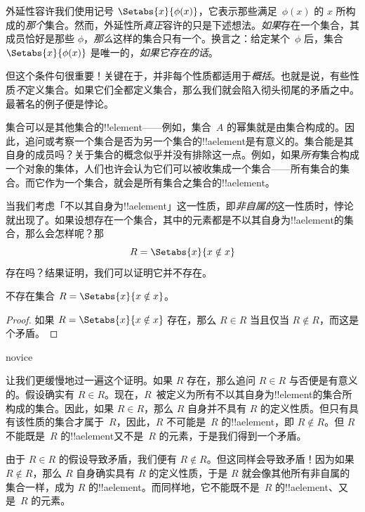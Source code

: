 \documentclass[../../../include/open-logic-section]{subfiles}
\begin{document}

外延性容许我们使用记号 $\Setabs{x}{\phi(x)}$，它表示那些满足~$\phi(x)$ 的 $x$ 所构成的\emph{那个}集合。然而，外延性所\emph{真正}容许的只是下述想法。\emph{如果}存在一个集合，其成员恰好是那些 $\phi$，\emph{那么}这样的集合只有一个。换言之：给定某个~$\phi$ 后，集合 $\Setabs{x}{\phi(x)}$ 是唯一的，\emph{如果它存在的话}。

但这个条件句很重要！{}关键在于，并非每个性质都适用于\emph{概括}。也就是说，有些性质\emph{不}定义集合。如果它们全都定义集合，那么我们就会陷入彻头彻尾的矛盾之中。最著名的例子便是悖论。

集合可以是其他集合的!!{element}——例如，集合~$A$ 的幂集就是由集合构成的。因此，追问或考察一个集合是否为另一个集合的!!a{element}是有意义的。集合能是其自身的成员吗？关于集合的概念似乎并没有排除这一点。例如，如果\emph{所有}集合构成一个对象的集体，人们也许会认为它们可以被收集成一个集合——所有集合的集合。而它作为一个集合，就会是所有集合之集合的!!a{element}。

当我们考虑「不以其自身为!!a{element}」这一性质，即\emph{非自属的}这一性质时，悖论就出现了。如果设想存在一个集合，其中的元素都是不以其自身为!!a{element}的集合，那么会怎样呢？那
\[
R = \Setabs{x}{x \notin x}
\]
存在吗？结果证明，我们可以证明它并不存在。

\begin{thm}
	不存在集合 $R = \Setabs{x}{x \notin x}$。
\end{thm}

\begin{proof}
如果 $R = \Setabs{x}{x \notin x}$ 存在，那么 $R \in R$ 当且仅当 $R \notin R$，而这是个矛盾。
\end{proof}

\begin{tagblock}{novice}
\begin{explain}
让我们更缓慢地过一遍这个证明。如果 $R$ 存在，那么追问 $R \in R$ 与否便是有意义的。假设确实有 $R \in R$。现在，$R$~被定义为所有不以其自身为!!{element}的集合所构成的集合。因此，如果 $R \in R$，那么 $R$ 自身并不具有 $R$ 的定义性质。但只有具有该性质的集合才属于~$R$，因此，$R$ 不可能是~$R$ 的!!a{element}，即 $R \notin R$。但 $R$ 不能既是~$R$ 的!!a{element}又不是~$R$ 的元素，于是我们得到一个矛盾。

由于 $R \in R$ 的假设导致矛盾，我们便有 $R \notin R$。但这同样会导致矛盾！{}因为如果 $R \notin R$，那么 $R$ 自身确实具有 $R$ 的定义性质，于是 $R$ 就会像其他所有非自属的集合一样，成为 $R$ 的!!a{element}。而同样地，它不能既不是~$R$ 的!!a{element}、又是~$R$ 的元素。
\end{explain}
\end{tagblock}
\end{document}
